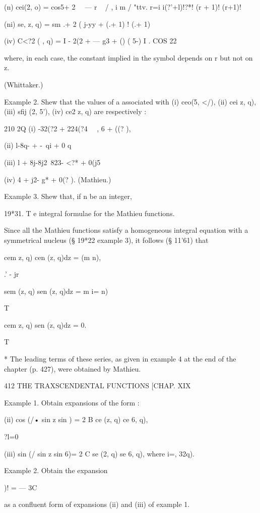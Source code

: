 (n) cei(2, o) = cos5+ 2 \ \ — r ~ / , i m / "ttv. 
  r=i i(?'+l)!?*! (r + 1)! (r+1)! 

(ni) se,  z, q) = sm .+ 2  ( j-yy  + (.+ 1) ! (.+ 1)   

(iv) C<?2 ( , q) = I - 2(2 + — g3 + () (  5-) I  . COS 22 

where, in each case, the constant implied in the symbol depends on r but not on z. 

(Whittaker.) 

Example 2. Shew that the values of a associated with (i) ceo(5, </), (ii) cei z, q), 
(iii) sfij (2, 5'), (iv) ce2  z, q) are respectively : 

210 2Q 
(i) -32(?2 + 224(?4 \ \  , 6 + ((? ), 

(ii) l-8q-   +  -\ qi + 0 q%



(iii) l + 8j-8j2\ 823- <?* + 0(j5 



(iv) 4 +  j2- g* + 0(? ). (Mathieu.) 

Example 3. Shew that, if n be an integer, 

19*31. T e integral formulae for the Mathieu functions. 

Since all the Mathieu functions satisfy a homogeneous integral equation 
with a symmetrical nucleus (§ 19*22 example 3), it follows (§ 11'61) that 

cem  z, q) cen (z, q)dz = (m   n), 

.' - jr 

sem (z, q) sen (z, q)dz =  m i= n) 

T 

cem  z, q) sen (z, q)dz = 0. 

T 

* The leading terms of these series, as given in example 4 at the end of the chapter (p. 427), 
were obtained by Mathieu. 



412 THE TRAXSCENDENTAL FUNCTIONS [CHAP. XIX 

Example 1. Obtain expansions of the form : 

(ii) cos (/• sin z sin  ) = 2 B ce  (z, q) ce   6, q), 

?l=0 

(iii) sin (/  sin z sin 6)= 2 C se  (2, q) se   6, q), 
where i=,  32q). 

Example 2. Obtain the expansion 

)! = — 3C 

as a confluent form of expansions (ii) and (iii) of example 1. 

